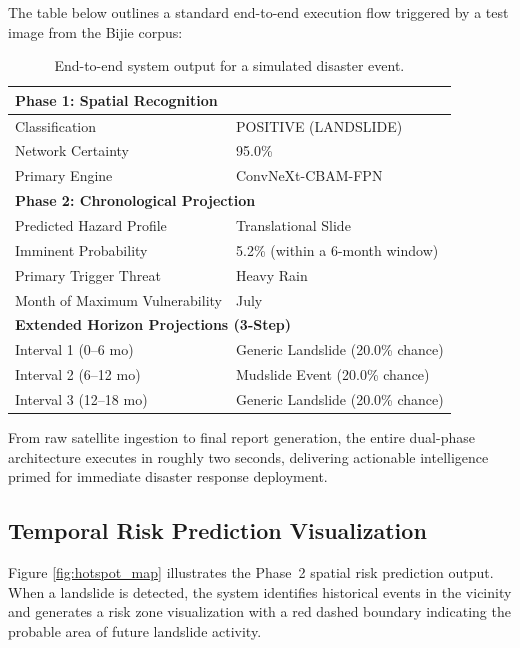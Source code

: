 \documentclass[12pt,a4paper]{report}
\begin{document}
The table below outlines a standard end-to-end execution flow triggered by a test image from the Bijie corpus:

\begin{table}[H]
\begin{center}
\caption{End-to-end system output for a simulated disaster event.}\label{tab:pipeline_output}
\begin{tabular}{ll}
\hline
\multicolumn{2}{l}{\bf Phase 1: Spatial Recognition} \\
\hline
Classification & POSITIVE (LANDSLIDE) \\
Network Certainty & 95.0\% \\
Primary Engine & ConvNeXt-CBAM-FPN \\
\hline
\multicolumn{2}{l}{\bf Phase 2: Chronological Projection} \\
\hline
Predicted Hazard Profile & Translational Slide \\
Imminent Probability & 5.2\% (within a 6-month window) \\
Primary Trigger Threat & Heavy Rain \\
Month of Maximum Vulnerability & July \\
\hline
\multicolumn{2}{l}{\bf Extended Horizon Projections (3-Step)} \\
\hline
Interval 1 (0--6 mo) & Generic Landslide (20.0\% chance) \\
Interval 2 (6--12 mo) & Mudslide Event (20.0\% chance) \\
Interval 3 (12--18 mo) & Generic Landslide (20.0\% chance) \\
\hline
\end{tabular}
\end{center}
\end{table}

From raw satellite ingestion to final report generation, the entire dual-phase architecture executes in roughly two seconds, delivering actionable intelligence primed for immediate disaster response deployment.

\subsection{Temporal Risk Prediction Visualization}

Figure \ref{fig:hotspot_map} illustrates the Phase~2 spatial risk prediction output. When a landslide is detected, the system identifies historical events in the vicinity and generates a risk zone visualization with a red dashed boundary indicating the probable area of future landslide activity.
\end{document}
